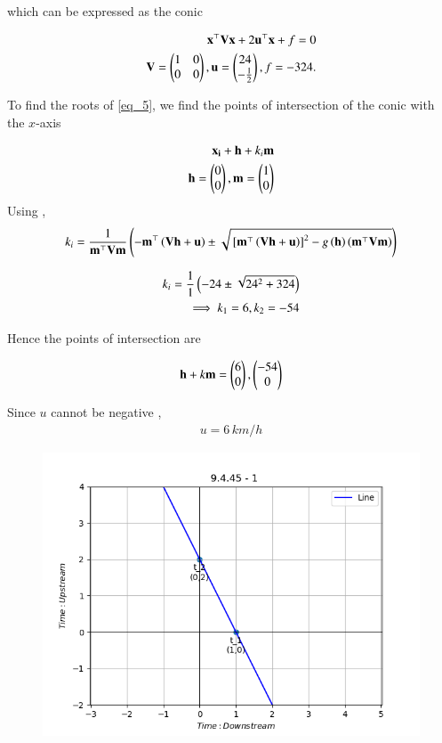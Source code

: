 \documentclass[journal]{IEEEtran}
\numberwithin{equation}{enumi}
\numberwithin{figure}{enumi}
\begin{document}
which can be expressed as the conic

\begin{align}
    \mathbf{x}^{\top}\mathbf{V}\mathbf{x} + 2\mathbf{u}^{\top}\mathbf{x} + f = 0 \label{eq_5}\\ 
    \mathbf{V} = \begin{pmatrix}1 & 0 \\ 0 & 0 \end{pmatrix} , \mathbf{u} = \begin{pmatrix}24 \\ -\frac{1}{2}\end{pmatrix} , f = -324.
\end{align}

To find the roots of \ref{eq_5}, we find the points of intersection of the conic with the $x$-axis

\begin{align}
    \mathbf{x_i} + \mathbf{h} + k_i\mathbf{m} \\ 
    \mathbf{h} = \begin{pmatrix}0\\0\end{pmatrix} , \mathbf{m} = \begin{pmatrix}1\\0\end{pmatrix}
\end{align}
Using , 
\begin{align}
    k_i = \frac{1}{\mathbf{m}^{\top}\mathbf{V}\mathbf{m}}\left(-\mathbf{m}^{\top}\left(\mathbf{V}\mathbf{h}+\mathbf{u}\right) \pm \sqrt{{}\left[\mathbf{m}^{\top}\left(\mathbf{V}\mathbf{h}+\mathbf{u}\right)\right]^2-g\left(\mathbf{h}\right)\left(\mathbf{m}^{\top}\mathbf{V}\mathbf{m}\right)}\right)
\end{align}

\begin{align}
    k_i = \frac{1}{1}\left(-24 \pm \sqrt{24^2 + 324}\right) \\ 
    \implies k_1 = 6 , k_2 = -54
\end{align}

Hence the points of intersection are 

\begin{align}
    \mathbf{h} + k\mathbf{m} = \begin{pmatrix}6 \\ 0 \end{pmatrix} , \begin{pmatrix}-54\\0\end{pmatrix}
\end{align}

Since $u$ cannot be negative , 
\begin{align}
    u = 6\,km/h
\end{align}

\begin{figure}[H]
    \centering
    \includegraphics[width=0.5\columnwidth]{figs/graph1_1.png}
    \caption*{}
    \label{fig:placeholder}
\end{figure}
\end{document}
